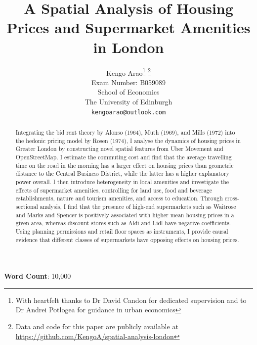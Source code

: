 \documentclass{article}
\title{A Spatial Analysis of Housing Prices and Supermarket Amenities in London}
\author{
  \large{Kengo Arao}\thanks{With heartfelt thanks to Dr David Candon for dedicated supervision and to Dr Andrei Potlogea for guidance in urban economics}      \thanks{Data and code for this paper are publicly available at \href{https://github.com/KengoA/spatial-analysis-london}{https://github.com/KengoA/spatial-analysis-london}} \\
  Exam Number: B059089 \\
  School of Economics\\
  The University of Edinburgh\\
  \texttt{kengoarao@outlook.com}
}
\begin{document}
\maketitle

\begin{abstract}
Integrating the bid rent theory by Alonso (1964), Muth (1969), and Mills (1972) into the hedonic pricing model by Rosen (1974), I analyse the dynamics of housing prices in Greater London by constructing novel spatial features from Uber Movement and OpenStreetMap. I estimate the commuting cost and find that the average travelling time on the road in the morning has a larger effect on housing prices than geometric distance to the Central Business District, while the latter has a higher explanatory power overall. I then introduce heterogeneity in local amenities and investigate the effects of supermarket amenities, controlling for land use, food and beverage establishments, nature and tourism amenities, and access to education. Through cross-sectional analysis, I find that the presence of high-end supermarkets such as Waitrose and Marks and Spencer is positively associated with higher mean housing prices in a given area, whereas discount stores such as Aldi and Lidl have negative coefficients. Using planning permissions and retail floor spaces as instruments, I provide causal evidence that different classes of supermarkets have opposing effects on housing prices. 

\end{abstract}

\begin{center}
    \textbf{Word Count}: 10,000
\end{center}

\newpage
\tableofcontents


\newpage
\end{document}
